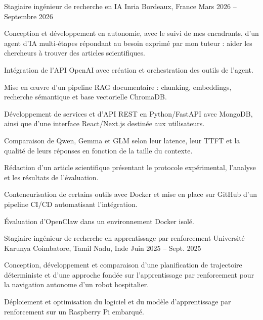 
\begin{cventries}
  \cventry
    {Stagiaire ingénieur de recherche en IA}
    {Inria}
    {Bordeaux, France}
    {Mars 2026 -- Septembre 2026}
    {
      \begin{cvitems}
        \item {Conception et développement en autonomie, avec le suivi de mes encadrants, d’un agent d’IA multi-étapes répondant au besoin exprimé par mon tuteur : aider les chercheurs à trouver des articles scientifiques.}
        \item {Intégration de l’API OpenAI avec création et orchestration des outils de l’agent.}
        \item {Mise en œuvre d’un pipeline RAG documentaire : chunking, embeddings, recherche sémantique et base vectorielle ChromaDB.}
        \item {Développement de services et d’API REST en Python/FastAPI avec MongoDB, ainsi que d’une interface React/Next.js destinée aux utilisateurs.}
        \item {Comparaison de Qwen, Gemma et GLM selon leur latence, leur TTFT et la qualité de leurs réponses en fonction de la taille du contexte.}
        \item {Rédaction d’un article scientifique présentant le protocole expérimental, l’analyse et les résultats de l’évaluation.}
        \item {Conteneurisation de certains outils avec Docker et mise en place sur GitHub d’un pipeline CI/CD automatisant l’intégration.}
        \item {Évaluation d’OpenClaw dans un environnement Docker isolé.}
      \end{cvitems}
    }

  \cventry
    {Stagiaire ingénieur de recherche en apprentissage par renforcement}
    {Université Karunya}
    {Coimbatore, Tamil Nadu, Inde}
    {Juin 2025 -- Sept. 2025}
    {
      \begin{cvitems}
        \item {Conception, développement et comparaison d’une planification de trajectoire déterministe et d’une approche fondée sur l’apprentissage par renforcement pour la navigation autonome d’un robot hospitalier.}
        \item {Déploiement et optimisation du logiciel et du modèle d’apprentissage par renforcement sur un Raspberry Pi embarqué.}
      \end{cvitems}
    }
\end{cventries}
